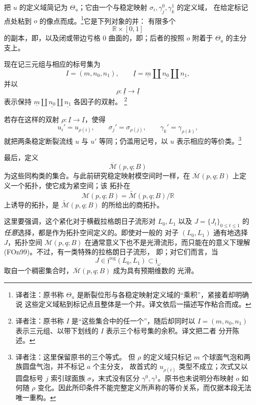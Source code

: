 把 $u$ 的定义域简记为 $\Theta_u$；它由一个\termBrokenConfiguration{}与稳定映射 $\sigma_i,\gamma_j^0,\gamma_k^1$ 的定义域，
在给定标记点处粘到 $o$ 的像点而成。\footnote{译者注：原书称
$\Theta_u$ 是断裂位形与各稳定映射定义域的“乘积”，紧接着却明确说
这些定义域粘到标记点且整体是一个并。译文依后一描述写作粘合而成。}它是下列对象的并：
有限多个
\[
  \mathbb R\times[0,1]
\]
的副本，即\termPrincipalComponent{}，以及闭或带边亏格 $0$ \personRiemann{}曲面的\termSemiStableCurve{}，即\termBubbleComponent{}；后者的\termBubbleRoot{}按照\termDistributionMap{} $o$ 附着于 $\Theta_u$ 的主分支上。

现在记三元组与相应的标号集为
\[
  I=(m,n_0,n_1),
  \qquad
  \underline I
  =
  \underline m\coprod\underline{n_0}\coprod\underline{n_1},
\]
并以
\[
  \rho:\underline I\longrightarrow\underline I
\]
表示保持\termCoproduct{}
$\underline m\coprod\underline{n_0}\coprod\underline{n_1}$ 各因子的双射。
\footnote{译者注：原书称 $I$ 是“这些集合中的任一个”，随后却同时以
$I=(m,n_0,n_1)$ 表示三元组、以带下划线的 $I$ 表示三个标号集的余积。译文把二者
分开陈述。}

若存在这样的双射 $\rho:\underline I\to\underline I$，使得
\[
  u_i'=u_{\rho(i)},
  \qquad
  \sigma_j'=\sigma_{\rho(j)},
  \qquad
  \gamma_k'=\gamma_{\rho(k)},
\]
就把两条稳定断裂流线 $u$ 与 $u'$ 等同；仍滥用记号，以
$u$ 表示相应的等价类。\footnote{译者注：这里保留原书的三个等式。
但 $\rho$ 的定义域只标记 $m$ 个球面气泡和两族圆盘气泡，并不标记 $a$ 个主分支，
故首式的 $u_{\rho(i)}$ 类型不成立；次式又以圆盘标号 $j$ 索引球面族
$\sigma$，末式没有区分 $\gamma^0,\gamma^1$。原书也未说明分布映射 $o$ 如何随
$\rho$ 变化。因此所印条件不能完整定义所声称的等价关系，而仅据本段无法唯一重构。}

最后，定义
\[
  \overline{\mathcal M}(p,q;B)
\]
为这些同构类的集合。与此前研究稳定映射模空间时一样，在
$\overline{\mathcal M}(p,q;B)$ 上定义一个拓扑，使它成为紧\personHausdorff{}空间；该
拓扑在
\[
  \mathcal M(p,q;B)
  =
  \widetilde{\mathcal M}(p,q;B)/\mathbb R
\]
上诱导的拓扑，是 $\widetilde{\mathcal M}(p,q;B)$ 的\termStrongCinfinityTopology{}所给出的商拓扑。

这里要强调，这个紧化对于横截拉格朗日子流形对 $L_0,L_1$ 以及
$J=\{J_t\}_{0\leq t\leq1}$ 的\emph{任意}选择，都是作为拓扑空间定义的。即使对一般的
对子 $(L_0,L_1)$ 通有地选择 $J$，拓扑空间
$\overline{\mathcal M}(p,q;B)$ 在通常意义下也不是光滑流形，而只能在\termKuranishiStructure{}的意义下理解 (FOn99)。不过，有一类特殊的拉格朗日子流形，
即\emph{\termMonotoneLagrangianSubmanifold{}}；对它们而言，当
\[
  J
  \in
  \mathfrak j^{\mathrm{reg}}(L_0,L_1)
  \subset
  \mathfrak j_\omega
\]
取自一个稠密集合时，$\overline{\mathcal M}(p,q;B)$ 成为具有预期维数的
光滑\termOrbifoldWithCorners{}。

